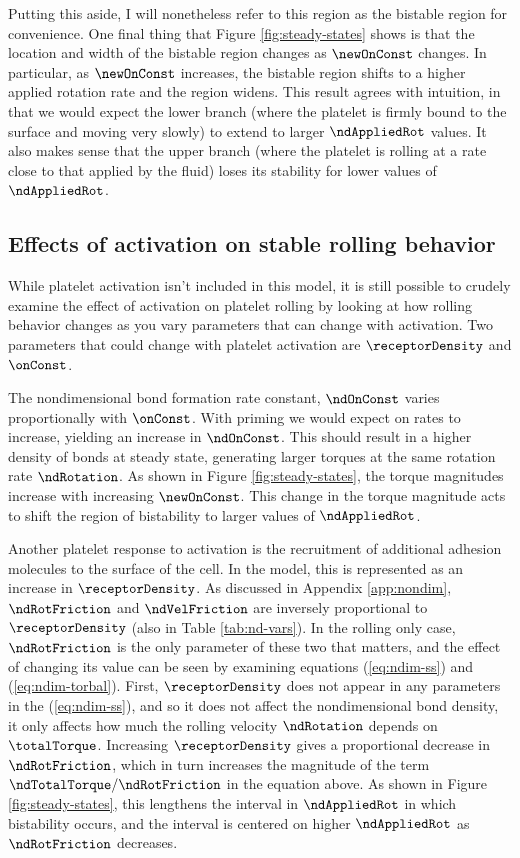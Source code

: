 Putting this aside, I will nonetheless refer to this region as the
bistable region for convenience. One final thing that Figure
\ref{fig:steady-states} shows is that the location and width of the
bistable region changes as $\newOnConst$ changes. In particular, as
$\newOnConst$ increases, the bistable region shifts to a higher applied
rotation rate and the region widens. This result agrees with
intuition, in that we would expect the lower branch (where the
platelet is firmly bound to the surface and moving very slowly) to
extend to larger $\ndAppliedRot$ values. It also makes sense that the
upper branch (where the platelet is rolling at a rate close to that
applied by the fluid) loses its stability for lower values of
$\ndAppliedRot$.

\subsection{Effects of activation on stable rolling behavior}
\label{sec:effects-activation}

While platelet activation isn't included in this model, it is still
possible to crudely examine the effect of activation on platelet
rolling by looking at how rolling behavior changes as you vary
parameters that can change with activation. Two parameters that could
change with platelet activation are $\receptorDensity$ and
$\onConst$.

The nondimensional bond formation rate constant, $\ndOnConst$ varies
proportionally with $\onConst$. With priming we would expect on rates
to increase, yielding an increase in $\ndOnConst$. This should result
in a higher density of bonds at steady state, generating larger
torques at the same rotation rate $\ndRotation$. As shown in Figure
\ref{fig:steady-states}, the torque magnitudes increase with
increasing $\newOnConst$. This change in the torque magnitude acts to
shift the region of bistability to larger values of $\ndAppliedRot$.

Another platelet response to activation is the recruitment of
additional adhesion mole\-cules to the surface of the cell. In the
model, this is represented as an increase in $\receptorDensity$. As
discussed in Appendix \ref{app:nondim}, $\ndRotFriction$ and
$\ndVelFriction$ are inversely proportional to $\receptorDensity$
(also in Table \ref{tab:nd-vars}). In the rolling only case,
$\ndRotFriction$ is the only parameter of these two that matters, and
the effect of changing its value can be seen by examining equations
(\ref{eq:ndim-ss}) and (\ref{eq:ndim-torbal}). First,
$\receptorDensity$ does not appear in any parameters in the
(\ref{eq:ndim-ss}), and so it does not affect the nondimensional bond
density, it only affects how much the rolling velocity $\ndRotation$
depends on $\totalTorque$. Increasing $\receptorDensity$ gives a
proportional decrease in $\ndRotFriction$, which in turn increases the
magnitude of the term $\ndTotalTorque/\ndRotFriction$ in the equation
above. As shown in Figure \ref{fig:steady-states}, this lengthens the
interval in $\ndAppliedRot$ in which bistability occurs, and the
interval is centered on higher $\ndAppliedRot$ as $\ndRotFriction$
decreases.

